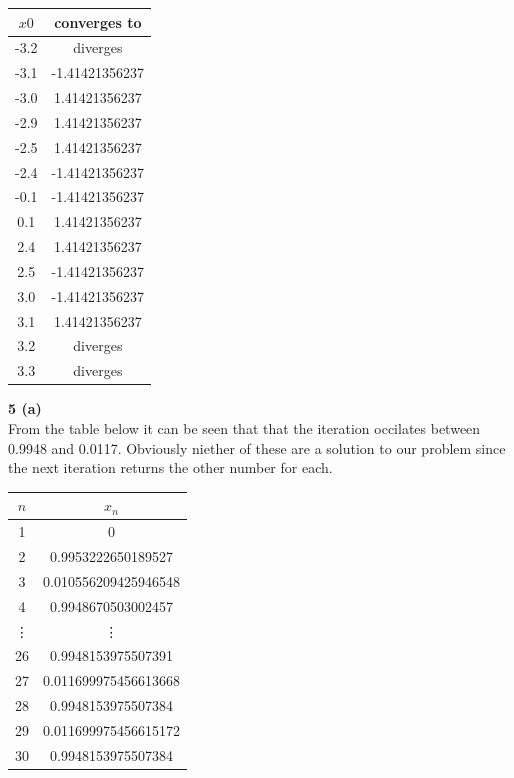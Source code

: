 \documentclass[12pt]{article}
\newcommand{\problem}[1]{\hspace{-4 ex} \large \textbf{#1}\\}
\begin{document}
	\singlespacing
	\begin{center}
		\begin{tabular}{|c|c|}
			\hline
			$x0$&converges to\\ \hline
			-3.2&diverges\\ \hline
			-3.1&-1.41421356237\\ \hline
			-3.0&1.41421356237\\ \hline
			-2.9&1.41421356237\\ \hline
			-2.5&1.41421356237\\ \hline
			-2.4&-1.41421356237\\ \hline
			-0.1&-1.41421356237\\ \hline
			0.1&1.41421356237\\ \hline
			2.4&1.41421356237\\ \hline
			2.5&-1.41421356237\\ \hline
			3.0&-1.41421356237\\ \hline
			3.1&1.41421356237\\ \hline
			3.2&diverges\\ \hline
			3.3&diverges\\ \hline
		\end{tabular}
	\end{center}
	\doublespacing
	

\problem{5 (a)}
	From the table below it can be seen that that the iteration occilates between 0.9948 and 0.0117. Obviously niether of these are a solution to our problem since the next iteration returns the other number for each.
	\singlespacing
	\begin{center}
		\begin{tabular}{|c|c|}
			\hline
			$n$&$x_n$\\ \hline
			1&0\\ \hline
			2&0.9953222650189527\\ \hline
			3&0.010556209425946548\\ \hline
			4&0.9948670503002457\\ \hline
			\vdots & \vdots \\ \hline
			26&0.9948153975507391\\ \hline
			27&0.011699975456613668\\ \hline
			28&0.9948153975507384\\ \hline
			29&0.011699975456615172\\ \hline
			30&0.9948153975507384\\ \hline
		\end{tabular}
	\end{center}
	\doublespacing
	
\end{document}
